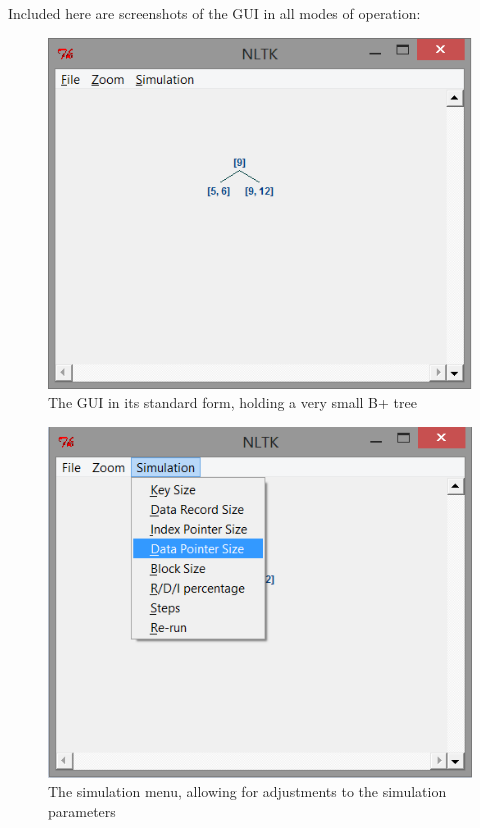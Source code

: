 \documentclass[fleqn]{article}
\begin{document}
Included here are screenshots of the GUI in all modes of operation:

\begin{figure}[h]
\centerline{\includegraphics{Images/gui1.png}}
\caption{The GUI in its standard form, holding a very small B+ tree}
\end{figure}

\begin{figure}[h]
\centerline{\includegraphics{Images/gui2.png}}
\caption{The simulation menu, allowing for adjustments to the simulation parameters}
\end{figure}
\end{document}
